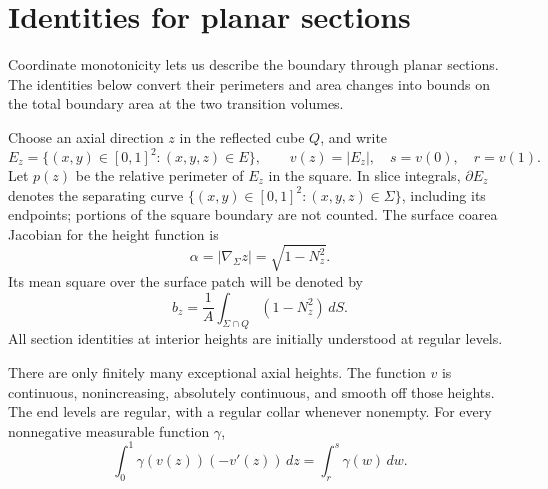 \section{Identities for planar sections}
\label{slice:section}

Coordinate monotonicity lets us describe the boundary through planar
sections. The identities below convert their perimeters and area changes
into bounds on the total boundary area at the two transition volumes.

Choose an axial direction \(z\) in the reflected cube \(Q\), and write
\[
 E_z=\{(x,y)\in[0,1]^2:(x,y,z)\in E\},\qquad
 v(z)=|E_z|,\quad s=v(0),\quad r=v(1).
\]
Let \(p(z)\) be the relative perimeter of \(E_z\) in the square.
In slice integrals, \(\partial E_z\) denotes the separating curve
\(\{(x,y)\in[0,1]^2:(x,y,z)\in\Sigma\}\), including its endpoints;
portions of the square boundary are not counted. The surface coarea
Jacobian for the height function is
\[
 \alpha=|\nabla_\Sigma z|=\sqrt{1-N_z^2}.
\]
Its mean square over the surface patch will be denoted by
\[
 b_z=\frac1A\int_{\Sigma\cap Q}(1-N_z^2)\,dS.
\]
All section identities at interior heights are initially understood
at regular levels.

\begin{lemma}\label{slice:regularity}
There are only finitely many exceptional axial heights.
The function \(v\) is continuous, nonincreasing, absolutely continuous,
and smooth off those heights. The end levels are regular, with a regular
collar whenever nonempty. For every nonnegative measurable function
\(\gamma\),
\begin{equation}
 \int_0^1 \gamma(v(z))(-v'(z))\,dz
       =\int_r^s\gamma(w)\,dw.
 \label{slice:substitution}
\end{equation}
\end{lemma}

